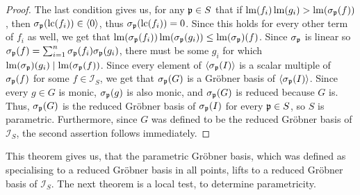 \begin{proof}
  The last condition gives us, for any $\mathfrak p \in S$ that if $\operatorname{lm}(f_{i})\operatorname{lm}(g_{i}) > \operatorname{lm}(\sigma_{\mathfrak p}(f))$, then $\sigma_{\mathfrak p}(\operatorname{lc}(f_{i})) \in \langle 0 \rangle$, thus $\sigma_{\mathfrak p}(\operatorname{lc}(f_{i})) = 0$. Since this holds for every other term of $f_{i}$ as well, we get that $\operatorname{lm}(\sigma_{\mathfrak p}(f_{i}))\operatorname{lm}(\sigma_{\mathfrak p}(g_{i})) \leq \operatorname{lm}(\sigma_{\mathfrak p})(f)$. Since $\sigma_{\mathfrak p}$ is linear so $\sigma_{\mathfrak p}(f) = \sum_{i=1}^{n} \sigma_{\mathfrak p}(f_{i}) \sigma_{\mathfrak p}(g_{i})$, there must be some $g_{i}$ for which $\operatorname{lm}(\sigma_{\mathfrak p})(g_{i}) \mid \operatorname{lm}(\sigma_{\mathfrak p}(f))$. Since every element of $\langle \sigma_{\mathfrak p}(I) \rangle$ is a scalar multiple of $\sigma_{\mathfrak p}(f)$ for some $f \in \mathcal I_{S}$, we get that $\sigma_{\mathfrak p}(G)$ is a Gröbner basis of $\langle \sigma_{\mathfrak p}(I) \rangle$. Since every $g \in G$ is monic, $\sigma_{\mathfrak p}(g)$ is also monic, and $\sigma_{\mathfrak p}(G)$ is reduced because $G$ is. Thus, $\sigma_{\mathfrak p}(G)$ is the reduced Gröbner basis of $\sigma_{\mathfrak p}(I)$ for every $\mathfrak p \in S$, so $S$ is parametric. Furthermore, since $G$ was defined to be the reduced Gröbner basis of $\mathcal I_{S}$, the second assertion follows immediately.
\end{proof}

This theorem gives us, that the parametric Gröbner basis, which was defined as specialising to a reduced Gröbner basis in all points, lifts to a reduced Gröbner basis of $\mathcal I_{S}$. The next theorem is a local test, to determine parametricity.

